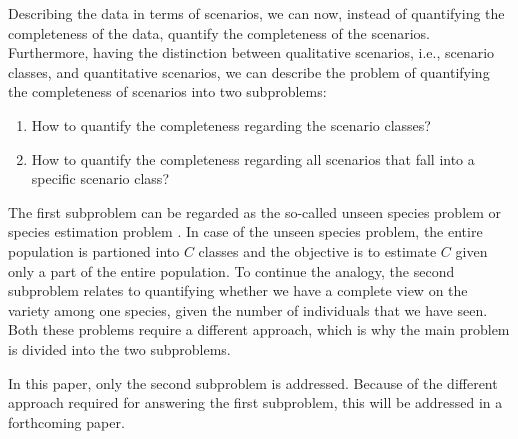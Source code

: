 Describing the data in terms of scenarios, we can now, instead of quantifying the completeness of the data, quantify the completeness of the scenarios. Furthermore, having the distinction between qualitative scenarios, i.e., scenario classes, and quantitative scenarios, we can describe the problem of quantifying the completeness of scenarios into two subproblems:
\begin{enumerate}
	\item How to quantify the completeness regarding the scenario classes?
	\item How to quantify the completeness regarding all scenarios that fall into a specific scenario class?
\end{enumerate}

The first subproblem can be regarded as the so-called unseen species problem \cite{bunge1993estimating} or species estimation problem \cite{yang2012estimating}. In case of the unseen species problem, the entire population is partioned into $C$ classes and the objective is to estimate $C$ given only a part of the entire population. To continue the analogy, the second subproblem relates to quantifying whether we have a complete view on the variety among one species, given the number of individuals that we have seen. Both these problems require a different approach, which is why the main problem is divided into the two subproblems.

In this paper, only the second subproblem is addressed. Because of the different approach required for answering the first subproblem, this will be addressed in a forthcoming paper.
